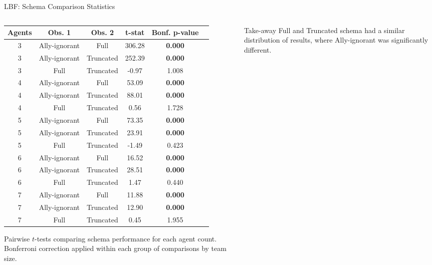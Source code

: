 \begin{frame}[shrink=20]{LBF: Schema Comparison Statistics}
    \vspace{2em}
\begin{columns}
    \begin{column}{0.65\linewidth}
        \begin{center}
            \scriptsize
            \begin{tabular}{cccccc}
                \toprule
                \textbf{Agents} & \textbf{Obs. 1} & \textbf{Obs. 2} & \textbf{t-stat} & \textbf{Bonf. p-value} \\
                \midrule
                3 & Ally-ignorant & Full      & 306.28 & \textbf{0.000} \\
                3 & Ally-ignorant & Truncated & 252.39 & \textbf{0.000} \\
                3 & Full          & Truncated &  -0.97 & 1.008 \\
                4 & Ally-ignorant & Full      &  53.09 & \textbf{0.000} \\
                4 & Ally-ignorant & Truncated &  88.01 & \textbf{0.000} \\
                4 & Full          & Truncated &   0.56 & 1.728 \\
                5 & Ally-ignorant & Full      &  73.35 & \textbf{0.000} \\
                5 & Ally-ignorant & Truncated &  23.91 & \textbf{0.000} \\
                5 & Full          & Truncated &  -1.49 & 0.423 \\
                6 & Ally-ignorant & Full      &  16.52 & \textbf{0.000} \\
                6 & Ally-ignorant & Truncated &  28.51 & \textbf{0.000} \\
                6 & Full          & Truncated &   1.47 & 0.440 \\
                7 & Ally-ignorant & Full      &  11.88 & \textbf{0.000} \\
                7 & Ally-ignorant & Truncated &  12.90 & \textbf{0.000} \\
                7 & Full          & Truncated &   0.45 & 1.955 \\
                \bottomrule
            \end{tabular}
        \end{center}
        \vspace{0.5em}
        \centering
        \footnotesize
        Pairwise $t$-tests comparing schema performance for each agent count. 
        Bonferroni correction applied within each group of comparisons by team size.
    \end{column}
    \begin{column}{0.30\linewidth}
        \begin{alertblock}{Take-away}
            Full and Truncated schema had a similar distribution of results,
            where Ally-ignorant was significantly different.
        \end{alertblock}
    \end{column}
\end{columns}


\end{frame}
